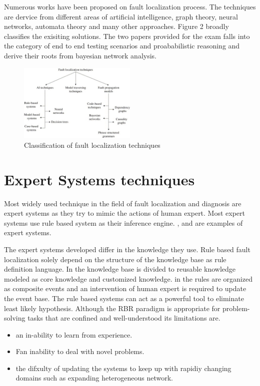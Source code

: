 \documentclass[10pt]{sigplan-proc-varsize}
\begin{document}
Numerous works have been proposed on fault localization process. The techniques are dervice from different areas of artificial intelligence, graph theory, 
neural networks, automata theory and many other approaches. Figure 2 broadly classifies the exisiting solutions. The two papers provided for the exam falls into the 
category of end to end testing scenarios and proababilistic reasoning and derive their roots from bayesian network analysis. 

\begin{figure}[h!]
  \caption{Classification of fault localization techniques}
  \centering
    \includegraphics[width=0.5\textwidth]{Fig2}
\end{figure}

\section{Expert Systems techniques}
Most widely used technique in the field of fault localization and diagnosis are expert systems as they try to mimic the actions of human expert. 
Most expert systems use rule based system as their inference engine. \cite{Peng:97},\cite{Liu:99} and \cite{Nygate:95} are examples of expert systems.

The expert systems developed differ in the knowledge they use. Rule based fault localization solely depend on the 
structure of the knowledge base as rule definition language. In \cite{Lor:93}   the knowledge base is divided to reusable 
knowledge modeled as core knowledge and customized knowledge.  in  \cite{Liu:99} the rules are organized as composite events and 
an intervention of human expert is required to update the event base.  The rule based systems can act as a powerful tool to eliminate 
least likely hypothesis. Although the RBR paradigm is appropriate for problem-solving tasks that are confined and well-understood its limitations are.

\begin{itemize}
  \item an in-ability to learn from experience.
  \item Fan inability to deal with novel problems.
  \item the difxulty of updating the systems to keep up with rapidiy changing domains such as expanding heterogeneous network.
\end{itemize}
\end{document}
